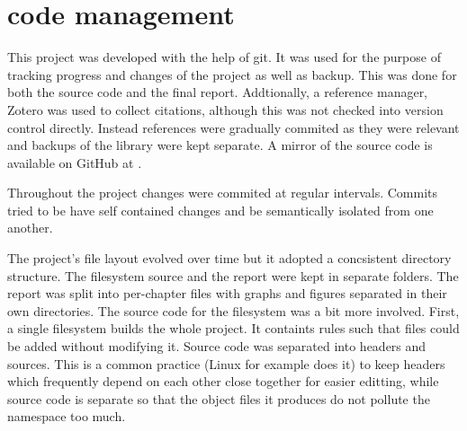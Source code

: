     \section{code management}

        This project was developed with the help of git. It was used for the
        purpose of tracking progress and changes of the project as well as
        backup. This was done for both the source code and the final report.
        Addtionally, a reference manager, Zotero \cite{zotero} was used to
        collect citations, although this was not checked into version control
        directly. Instead references were gradually commited as they were
        relevant and backups of the library were kept separate. A mirror of
        the source code is available on GitHub at \cite{source_repository}.

        Throughout the project changes were commited at regular intervals.
        Commits tried to be have self contained changes and be semantically
        isolated from one another.

        The project's file layout evolved over time but it adopted a
        concsistent directory structure. The filesystem source and the report
        were kept in separate folders. The report was split into per-chapter
        files with graphs and figures separated in their own directories. The
        source code for the filesystem was a bit more involved. First, a single
        filesystem builds the whole project. It containts rules such that files
        could be added without modifying it. Source code was separated into
        headers and sources. This is a common practice (Linux
        \cite{Linux_source} for example does it) to keep headers which
        frequently depend on each other close together for easier editting,
        while source code is separate so that the object files it produces do
        not pollute the namespace too much.
